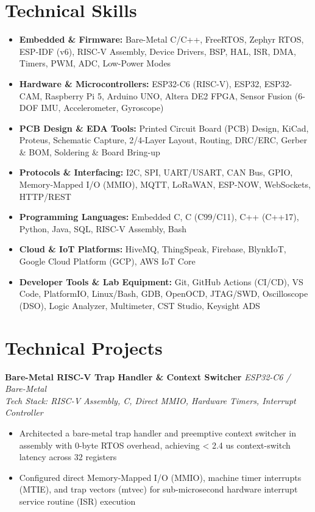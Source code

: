 \documentclass[a4paper,9pt]{extarticle}
\newcommand{\resumeItem}[1]{\item #1}
\newenvironment{resumeItemize}{\begin{itemize}[leftmargin=12pt, itemsep=0.2pt, parsep=0pt, topsep=0.4pt, partopsep=0pt]}{\end{itemize}}
\newcommand{\resumeProject}[3]{
  \textbf{#1} \hfill \textit{#2} \\
  \textit{Tech Stack: #3}
}
\begin{document}
\section*{Technical Skills}
\begin{resumeItemize}
    \resumeItem{\textbf{Embedded \& Firmware:} Bare-Metal C/C++, FreeRTOS, Zephyr RTOS, ESP-IDF (v6), RISC-V Assembly, Device Drivers, BSP, HAL, ISR, DMA, Timers, PWM, ADC, Low-Power Modes}
    \resumeItem{\textbf{Hardware \& Microcontrollers:} ESP32-C6 (RISC-V), ESP32, ESP32-CAM, Raspberry Pi 5, Arduino UNO, Altera DE2 FPGA, Sensor Fusion (6-DOF IMU, Accelerometer, Gyroscope)}
    \resumeItem{\textbf{PCB Design \& EDA Tools:} Printed Circuit Board (PCB) Design, KiCad, Proteus, Schematic Capture, 2/4-Layer Layout, Routing, DRC/ERC, Gerber \& BOM, Soldering \& Board Bring-up}
    \resumeItem{\textbf{Protocols \& Interfacing:} I2C, SPI, UART/USART, CAN Bus, GPIO, Memory-Mapped I/O (MMIO), MQTT, LoRaWAN, ESP-NOW, WebSockets, HTTP/REST}
    \resumeItem{\textbf{Programming Languages:} Embedded C, C (C99/C11), C++ (C++17), Python, Java, SQL, RISC-V Assembly, Bash}
    \resumeItem{\textbf{Cloud \& IoT Platforms:} HiveMQ, ThingSpeak, Firebase, BlynkIoT, Google Cloud Platform (GCP), AWS IoT Core}
    \resumeItem{\textbf{Developer Tools \& Lab Equipment:} Git, GitHub Actions (CI/CD), VS Code, PlatformIO, Linux/Bash, GDB, OpenOCD, JTAG/SWD, Oscilloscope (DSO), Logic Analyzer, Multimeter, CST Studio, Keysight ADS}
\end{resumeItemize}

\section*{Technical Projects}

\resumeProject{Bare-Metal RISC-V Trap Handler \& Context Switcher}{ESP32-C6 / Bare-Metal}{RISC-V Assembly, C, Direct MMIO, Hardware Timers, Interrupt Controller}
\begin{resumeItemize}
    \resumeItem{Architected a bare-metal trap handler and preemptive context switcher in assembly with 0-byte RTOS overhead, achieving < 2.4 us context-switch latency across 32 registers}
    \resumeItem{Configured direct Memory-Mapped I/O (MMIO), machine timer interrupts (MTIE), and trap vectors (mtvec) for sub-microsecond hardware interrupt service routine (ISR) execution}
\end{resumeItemize}
\vspace{0.8pt}
\end{document}
